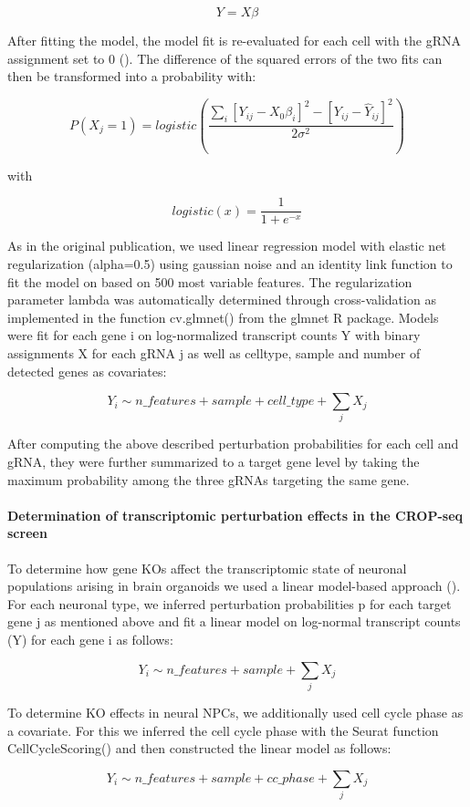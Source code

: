 \[ Y = X\beta \]

After fitting the model, the model fit is re-evaluated for each cell with the gRNA assignment set to 0 (). The difference of the squared errors of the two fits can then be transformed into a probability with:
 
\[ P(X_j=1) = logistic(\frac{\sum_i [Y_{ij}-X_0\beta_i]^2 - [Y_{ij} - \hat{Y}_{ij}]^2}{2\sigma^2}) \]

with 

\[ logistic(x) = \frac{1}{1+e^{-x}} \]
 
As in the original publication, we used linear regression model with elastic net regularization (alpha=0.5) using gaussian noise and an identity link function to fit the model on  based on 500 most variable features. The regularization parameter lambda was automatically determined through cross-validation as implemented in the function  cv.glmnet() from the glmnet R package. Models were fit for each gene i on log-normalized transcript counts Y with binary assignments X for each gRNA j as well as celltype, sample and number of detected genes as covariates:
 
\[ Y_i \sim n\_features + sample + cell\_type + \sum_j X_j \]
 
After computing the above described perturbation probabilities for each cell and gRNA, they were further summarized to a target gene level by taking the maximum probability among the three gRNAs targeting the same gene.
 
 
\paragraph{Determination of transcriptomic perturbation effects in the CROP-seq screen}
To determine how gene KOs affect the transcriptomic state of neuronal populations arising in brain organoids we used a linear model-based approach (\cite{dixit_perturb-seq_2016}). For each neuronal type, we inferred perturbation probabilities p for each target gene j as mentioned above  and fit a linear model on log-normal transcript counts (Y) for each gene i as follows:
 
\[ Y_i \sim n\_features + sample + \sum_j X_j \]
 
To determine KO effects in neural NPCs, we additionally used cell cycle phase as a covariate. For this we inferred the cell cycle phase with the Seurat function CellCycleScoring() and then constructed the linear model as follows:
 
\[ Y_i \sim n\_features + sample + cc\_phase + \sum_j X_j \]
 
